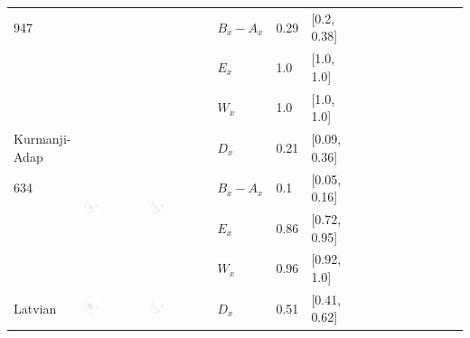 \documentclass[11pt,letterpaper]{article}
\begin{document}
\begin{longtable}{lllllllllllllll}
947  &    &    &  $B_x-A_x$  &  0.29  &  [0.2, 0.38]  \\ 
  &    &    &  $E_x$  &  1.0  &  [1.0, 1.0]  \\ 
  &    &    &  $W_x$  &  1.0  &  [1.0, 1.0]  \\ [10.25ex] \hline
Kurmanji-Adap  &  \multirow{4}{*}{\includegraphics[width=0.25\textwidth]{figures/Kurmanji-Adap-entropy-memory.pdf}}  &  \multirow{4}{*}{\includegraphics[width=0.25\textwidth]{figures/Kurmanji-Adap-listener-surprisal-memory.pdf}}  &  $D_x$  &  0.21  &  [0.09, 0.36]  \\ 
634  &    &    &  $B_x-A_x$  &  0.1  &  [0.05, 0.16]  \\ 
  &    &    &  $E_x$  &  0.86  &  [0.72, 0.95]  \\ 
  &    &    &  $W_x$  &  0.96  &  [0.92, 1.0]  \\ [10.25ex] \hline
Latvian  &  \multirow{4}{*}{\includegraphics[width=0.25\textwidth]{figures/Latvian-entropy-memory.pdf}}  &  \multirow{4}{*}{\includegraphics[width=0.25\textwidth]{figures/Latvian-listener-surprisal-memory.pdf}}  &  $D_x$  &  0.51  &  [0.41, 0.62]  \\ 

\end{longtable}
\end{document}
